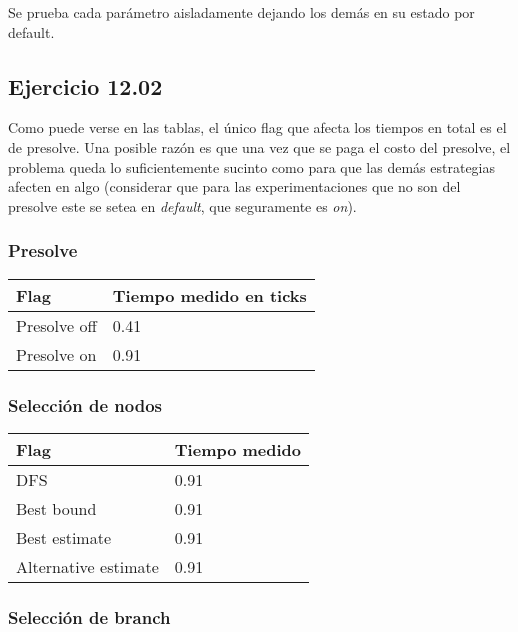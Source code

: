 Se prueba cada parámetro aisladamente dejando los demás en su estado por default.

\subsection{Ejercicio 12.02}
Como puede verse en las tablas, el único flag que afecta los tiempos en total es el de presolve.
Una posible razón es que una vez que se paga el costo del presolve, el problema queda lo suficientemente sucinto como para que las demás estrategias afecten en algo (considerar que para las experimentaciones que no son del presolve este se setea en \emph{default}, que seguramente es \emph{on}).

\subsubsection{Presolve}

    \begin{center}
        \begin{tabular}{ | m{7em} | m{5cm} | }
        \hline
        Flag & Tiempo medido en ticks \\
        \hline
        Presolve off & 0.41 \\
        \hline
        Presolve on & 0.91 \\
        \hline
        \end{tabular}
    \end{center}

\subsubsection{Selección de nodos}

    \begin{center}
        \begin{tabular}{ | m{11em} | m{5cm} | }
        \hline
        Flag & Tiempo medido \\
        \hline
        DFS & 0.91 \\
        \hline
        Best bound & 0.91 \\
        \hline
        Best estimate & 0.91 \\
        \hline
        Alternative estimate & 0.91 \\
        \hline
        \end{tabular}
    \end{center}


\subsubsection{Selección de branch}

